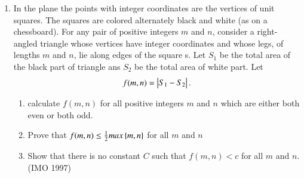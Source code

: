 \begin{enumerate}
 \item In the plane the points with integer coordinates are the vertices of unit squares. The squares are colored alternately black and white (as on a chessboard).
For any pair of positive integers $m$ and $n$, consider a right-angled triangle whose vertices have integer coordinates and whose legs, of lengths $m$ and $n$, lie along edges of the square s.
Let $S_1$ be the total area of the black part of triangle ans $S_2$ be the total area of white part. Let
  \begin{align}
          f(m,n)=\begin{vmatrix}S_1-S_2\end{vmatrix}.
  \end{align}
  \begin{enumerate}
\item calculate $f(m,n)$ for all positive integers $m$ and $n$ which are either both even or both odd.
 \item Prove that $f(m,n) \leq \frac{1}{2}max\left\{m,n\right\}$ for all $m$ and $n$
  \item Show that there is no constant $C$ such that $f(m,n)<c$ for all $m$ and $n$.\hfill(IMO 1997)
  \end{enumerate}	


\end{enumerate}
